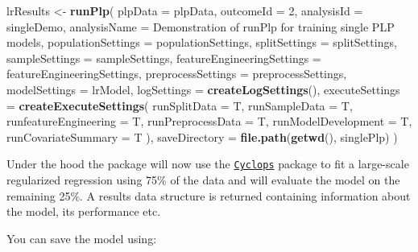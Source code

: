 \documentclass[
]{article}
\newenvironment{Shaded}{\begin{snugshade}}{\end{snugshade}}
\newcommand{\AttributeTok}[1]{\textcolor[rgb]{0.13,0.29,0.53}{#1}}
\newcommand{\DecValTok}[1]{\textcolor[rgb]{0.00,0.00,0.81}{#1}}
\newcommand{\FunctionTok}[1]{\textcolor[rgb]{0.13,0.29,0.53}{\textbf{#1}}}
\newcommand{\NormalTok}[1]{#1}
\newcommand{\OtherTok}[1]{\textcolor[rgb]{0.56,0.35,0.01}{#1}}
\newcommand{\SpecialCharTok}[1]{\textcolor[rgb]{0.81,0.36,0.00}{\textbf{#1}}}
\newcommand{\StringTok}[1]{\textcolor[rgb]{0.31,0.60,0.02}{#1}}
\begin{document}
\begin{Shaded}
\begin{Highlighting}[]
\NormalTok{  lrResults }\OtherTok{\textless{}{-}} \FunctionTok{runPlp}\NormalTok{(}
    \AttributeTok{plpData =}\NormalTok{ plpData,}
    \AttributeTok{outcomeId =} \DecValTok{2}\NormalTok{, }
    \AttributeTok{analysisId =} \StringTok{\textquotesingle{}singleDemo\textquotesingle{}}\NormalTok{,}
    \AttributeTok{analysisName =} \StringTok{\textquotesingle{}Demonstration of runPlp for training single PLP models\textquotesingle{}}\NormalTok{,}
    \AttributeTok{populationSettings =}\NormalTok{ populationSettings, }
    \AttributeTok{splitSettings =}\NormalTok{ splitSettings,}
    \AttributeTok{sampleSettings =}\NormalTok{ sampleSettings, }
    \AttributeTok{featureEngineeringSettings =}\NormalTok{ featureEngineeringSettings, }
    \AttributeTok{preprocessSettings =}\NormalTok{ preprocessSettings,}
    \AttributeTok{modelSettings =}\NormalTok{ lrModel,}
    \AttributeTok{logSettings =} \FunctionTok{createLogSettings}\NormalTok{(), }
    \AttributeTok{executeSettings =} \FunctionTok{createExecuteSettings}\NormalTok{(}
      \AttributeTok{runSplitData =}\NormalTok{ T, }
      \AttributeTok{runSampleData =}\NormalTok{ T, }
      \AttributeTok{runfeatureEngineering =}\NormalTok{ T, }
      \AttributeTok{runPreprocessData =}\NormalTok{ T, }
      \AttributeTok{runModelDevelopment =}\NormalTok{ T, }
      \AttributeTok{runCovariateSummary =}\NormalTok{ T}
\NormalTok{    ), }
    \AttributeTok{saveDirectory =} \FunctionTok{file.path}\NormalTok{(}\FunctionTok{getwd}\NormalTok{(), }\StringTok{\textquotesingle{}singlePlp\textquotesingle{}}\NormalTok{)}
\NormalTok{    )}
\end{Highlighting}
\end{Shaded}

Under the hood the package will now use the
\href{www.github.com/OHDSI/Cyclops}{\texttt{Cyclops}} package to fit a
large-scale regularized regression using 75\% of the data and will
evaluate the model on the remaining 25\%. A results data structure is
returned containing information about the model, its performance etc.

You can save the model using:

\begin{Shaded}
\end{Shaded}
\end{document}
